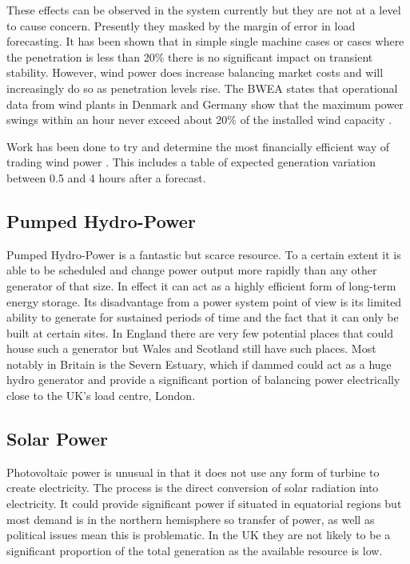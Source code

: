 \documentclass[a4paper,oneside,12pt]{report}
\begin{document}
These effects can be observed in the system currently but they are not at a level to cause concern. Presently they masked by the margin of error in load forecasting. It has been shown that in simple single machine cases or cases where the penetration is less than 20\% there is no significant impact on transient stability. However, wind power does increase balancing market costs and will increasingly do so as penetration levels rise. The BWEA states that operational data from wind plants in Denmark and Germany
 show that the maximum power swings within an hour never exceed about 20\% of the installed wind capacity \cite{BWEA2005e}.

Work has been done to try and determine the most financially efficient way of trading wind power \cite{Bathurst2002}. This includes a table of expected generation variation between 0.5 and 4 hours after a forecast.

\subsection{Pumped Hydro-Power}

Pumped Hydro-Power is a fantastic but scarce resource. To a certain extent it is able to be scheduled and change power output more rapidly than any other generator of that size. In effect it can act as a highly efficient form of long-term energy storage. Its disadvantage from a power system point of view is its limited ability to generate for sustained periods of time and the fact that it can only be built at certain sites. In England there are very few potential places that could house such a generator but Wales and Scotland still have such places. Most notably in Britain is the Severn Estuary, which if dammed could act as a huge hydro generator and provide a significant portion of balancing power electrically close to the UK's load centre, London.

\subsection{Solar Power}

Photovoltaic power is unusual in that it does not use any form of turbine to create electricity. The process is the direct conversion of solar radiation into electricity. It could provide significant power if situated in equatorial regions but most demand is in the northern hemisphere so transfer of power, as well as political issues mean this is problematic. In the UK they are not likely to be a significant proportion of the total generation as the available resource is low.
\end{document}
